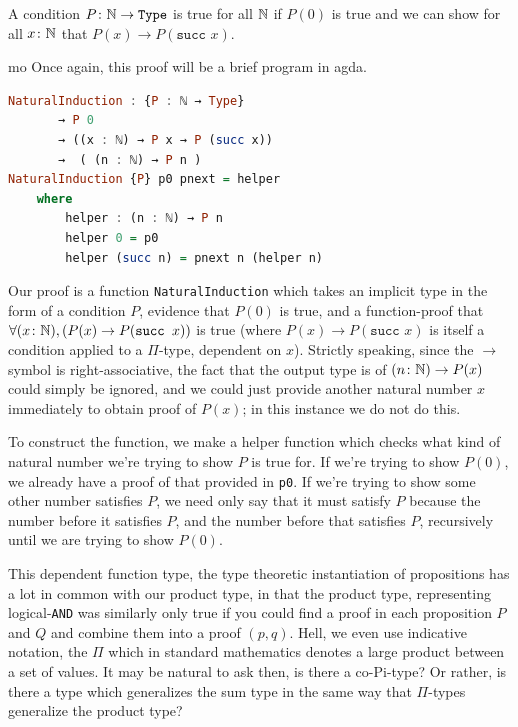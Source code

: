 \documentclass[11pt]{article}
\begin{document}
\begin{proposition}
A condition $P \colon \mathbb{N} \to \mathtt{Type}$ is true for all $\mathbb{N}$ if $P(0)$ is true and we can show for all $x \colon \mathbb{N}$ that $P(x) \to P(\texttt{succ } x )$.
\end{proposition}
\begin{my proof}{mo}
Once again, this proof will be a brief program in agda. \begin{lstlisting}[language=Haskell]
NaturalInduction : {P : ℕ → Type}
       → P 0
       → ((x : ℕ) → P x → P (succ x))
       →  ( (n : ℕ) → P n )
NaturalInduction {P} p0 pnext = helper
	where
 		helper : (n : ℕ) → P n
		helper 0 = p0
 		helper (succ n) = pnext n (helper n)
\end{lstlisting}
Our proof is a function \texttt{NaturalInduction} which takes an implicit type in the form of a condition $P$, evidence that $P(0)$ is true, and a function-proof that $\forall (x \colon \mathbb{N}), (P(x) \to P(\texttt{succ }x))$ is true (where $P(x) \to P(\texttt{succ }x)$ is itself a condition applied to a $\Pi$-type, dependent on $x$). Strictly speaking, since the $\to$ symbol is right-associative, the fact that the output type is of $(n \colon \mathbb{N}) \to P(x)$ could simply be ignored, and we could just provide another natural number $x$ immediately to obtain proof of $P(x)$; in this instance we do not do this.

To construct the function, we make a helper function which checks what kind of natural number we're trying to show $P$ is true for. If we're trying to show $P(0)$, we already have a proof of that provided in \texttt{p0}. If we're trying to show some other number satisfies $P$, we need only say that it must satisfy $P$ because the number before it satisfies $P$, and the number before that satisfies $P$, recursively until we are trying to show $P(0)$.
\end{my proof}

This dependent function type, the type theoretic instantiation of  propositions has a lot in common with our product type, in that the product type, representing logical-\texttt{AND} was similarly only true if you could find a proof in each proposition $P$ and $Q$ and combine them into a proof $(p,q)$. Hell, we even use indicative notation, the $\Pi$ which in standard mathematics denotes a large product between a set of values. It may be natural to ask then, is there a co-Pi-type? Or rather, is there a type which generalizes the sum type in the same way that $\Pi$-types generalize the product type?
\end{document}
